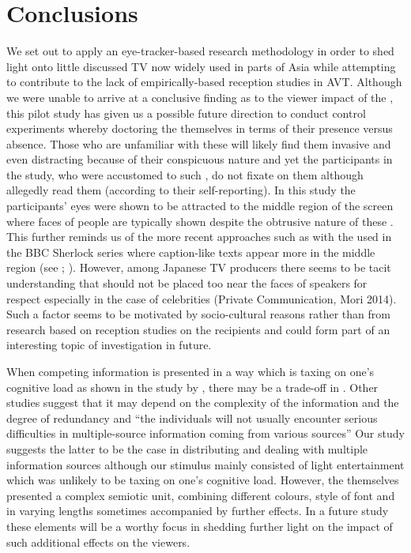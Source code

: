 \documentclass[output=paper]{langsci/langscibook}
\begin{document}
\section{Conclusions}

We set out to apply an eye-tracker-based research methodology in order to shed light onto little discussed TV  now widely used in parts of Asia while attempting to contribute to the lack of empirically-based reception studies in AVT. Although we were unable to arrive at a conclusive finding as to the viewer impact of the , this pilot study has given us a possible future direction to conduct control experiments whereby doctoring the  themselves in terms of their presence versus absence. Those who are unfamiliar with these  will likely find them invasive and even distracting because of their conspicuous nature and yet the participants in the study, who were accustomed to such , do not fixate on them although allegedly read them (according to their self-reporting). In this study the participants' eyes were shown to be attracted to the middle region of the screen where faces of people are typically shown despite the obtrusive nature of these . This further reminds us of the more recent approaches such as with the  used in the BBC Sherlock series where caption-like texts appear more in the middle region (see \citealt{Sasamoto2014}; \citealt{Dwyer2015}).  However, among Japanese TV producers there seems to be tacit understanding that  should not be placed too near the faces of speakers for respect especially in the case of celebrities (Private Communication, Mori 2014).  Such a factor seems to be motivated by socio-cultural reasons rather than from research based on reception studies on the recipients and could form part of an interesting topic of investigation in future. 


When competing information is presented in a way which is taxing on one's cognitive load as shown in the study by \citet{caffrey2009}, there may be a trade-off in .  Other studies \citep[265]{perego2010} suggest that it may depend on the complexity of the information and the degree of redundancy and ``the individuals will not usually encounter serious difficulties in multiple-source information coming from various sources'' Our study suggests the latter to be the case in distributing  and dealing with multiple information sources although our stimulus mainly consisted of light entertainment which was unlikely to be taxing on one's cognitive load.  However, the  themselves presented a complex semiotic unit, combining different colours, style of font and in varying lengths sometimes accompanied by further effects. In a future study these elements will be a worthy focus in shedding further light on the impact of such additional effects on the viewers. 
\end{document}
